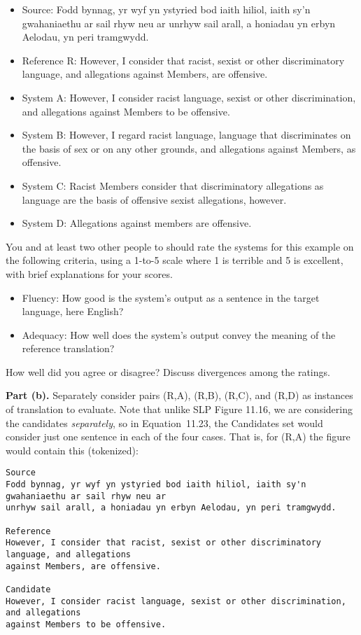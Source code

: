 \documentclass{article}
\begin{document}
\begin{itemize}
\item Source:  Fodd bynnag, yr wyf yn ystyried bod iaith hiliol, iaith sy'n gwahaniaethu ar sail rhyw neu ar unrhyw sail arall, a honiadau yn erbyn Aelodau, yn peri tramgwydd.
\item Reference R:  However, I consider that racist, sexist or other discriminatory language, and allegations against Members, are offensive.
\item System A: However, I consider racist language, sexist or other discrimination, and allegations against Members to be offensive.
\item System B:  However, I regard racist language, language that discriminates on the basis of sex or on any other grounds, and allegations against Members, as offensive.
\item System C: Racist Members consider that discriminatory allegations as language are the basis of offensive sexist allegations, however.
\item System D: Allegations against members are offensive.
\end{itemize}

You and at least two other people to should rate the systems for this example on the following criteria, using a 1-to-5 scale where 1 is terrible and 5 is excellent, with brief explanations for your scores.
\begin{itemize}
\item Fluency: How good is the system's output as a sentence in the target language, here English?
\item Adequacy: How well does the system's output convey the meaning of the reference translation?
\end{itemize}
How well did you agree or disagree? Discuss divergences among the ratings.

{\bf Part (b).} Separately consider pairs (R,A), (R,B), (R,C), and (R,D) as instances of translation to evaluate.  Note that unlike SLP Figure 11.16, we are considering the candidates \emph{separately}, so in Equation~11.23, the Candidates set would consider just one sentence in each of the four cases.  That is, for (R,A) the figure would contain this (tokenized):
\begin{small}
\begin{verbatim}
Source
Fodd bynnag, yr wyf yn ystyried bod iaith hiliol, iaith sy'n gwahaniaethu ar sail rhyw neu ar 
unrhyw sail arall, a honiadau yn erbyn Aelodau, yn peri tramgwydd.

Reference
However, I consider that racist, sexist or other discriminatory language, and allegations 
against Members, are offensive.

Candidate
However, I consider racist language, sexist or other discrimination, and allegations 
against Members to be offensive.
\end{verbatim}
\end{small}
\end{document}
